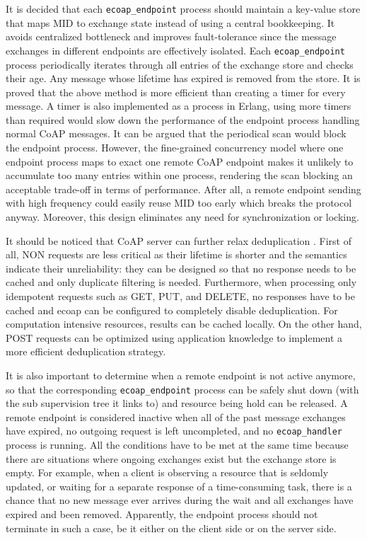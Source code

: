 It is decided that each \verb|ecoap_endpoint| process should maintain a key-value store that maps MID to exchange state instead of using a central bookkeeping. It avoids centralized bottleneck and improves fault-tolerance since the message exchanges in different endpoints are effectively isolated. Each \verb|ecoap_endpoint| process periodically iterates through all entries of the exchange store and checks their age. Any message whose lifetime has expired is removed from the store. It is proved that the above method is more efficient than creating a timer for every message. A timer is also implemented as a process in Erlang, using more timers than required would slow down the performance of the endpoint process handling normal CoAP messages. It can be argued that the periodical scan would block the endpoint process. However, the fine-grained concurrency model where one endpoint process maps to exact one remote CoAP endpoint makes it unlikely to accumulate too many entries within one process, rendering the scan blocking an acceptable trade-off in terms of performance. After all, a remote endpoint sending with high frequency could easily reuse MID too early which breaks the protocol anyway. Moreover, this design eliminates any need for synchronization or locking.

It should be noticed that CoAP server can further relax deduplication \autocite{coap_protocol}. First of all, NON requests are less critical as their lifetime is shorter and the semantics indicate their unreliability: they can be designed so that no response needs to be cached and only duplicate filtering is needed. Furthermore, when processing only idempotent requests such as GET, PUT, and DELETE, no responses have to be cached and ecoap can be configured to completely disable deduplication. For computation intensive resources, results can be cached locally. On the other hand, POST requests can be optimized using application knowledge to implement a more efficient deduplication strategy. 

It is also important to determine when a remote endpoint is not active anymore, so that the corresponding \verb|ecoap_endpoint| process can be safely shut down (with the sub supervision tree it links to) and resource being hold can be released. A remote endpoint is considered inactive when all of the past message exchanges have expired, no outgoing request is left uncompleted, and no \verb|ecoap_handler| process is running. All the conditions have to be met at the same time because there are situations where ongoing exchanges exist but the exchange store is empty. For example, when a client is observing a resource that is seldomly updated, or waiting for a separate response of a time-consuming task, there is a chance that no new message ever arrives during the wait and all exchanges have expired and been removed. Apparently, the endpoint process should not terminate in such a case, be it either on the client side or on the server side. 


